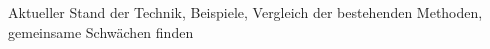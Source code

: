 Aktueller Stand der Technik, Beispiele, Vergleich der bestehenden Methoden, gemeinsame Schw\"achen finden